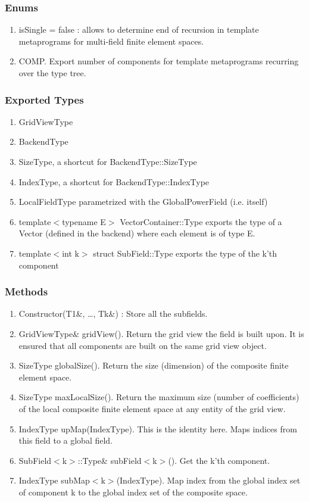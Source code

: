 \documentclass[11pt,a4paper,DIV11,%
notitlepage,oneside,abstracton,%
bibtotoc]{scrartcl}
\begin{document}
\subsubsection{Enums}

\begin{enumerate}[1)]
\item isSingle = false : allows to determine end of recursion in
  template metaprograms for multi-field finite element spaces.
\item COMP. Export number of components for template
  metaprograms recurring over the type tree.
\end{enumerate}

\subsubsection{Exported Types}

\begin{enumerate}[1)]
\item GridViewType 
\item BackendType
\item SizeType, a shortcut for BackendType::SizeType
\item IndexType, a shortcut for BackendType::IndexType
\item LocalFieldType parametrized with the GlobalPowerField (i.e. itself)
\item template$<$typename E$>$ VectorContainer::Type exports the type of a Vector
  (defined in the backend) where each element is of type E.
\item template$<$int k$>$ struct SubField::Type exports the type of
  the k'th component
\end{enumerate}

\subsubsection{Methods}

\begin{enumerate}[1)]
\item Constructor(T1\&, \ldots , Tk\&) : Store all the subfields.
\item GridViewType\& gridView(). Return the grid view 
  the field is built upon. It is ensured that all components are built
  on the same grid view object.
\item SizeType globalSize(). Return the size (dimension) of the
  composite finite element space.  
\item SizeType maxLocalSize(). Return the maximum size (number of
  coefficients) of the local composite finite element space at any entity of the
  grid view.
\item IndexType upMap(IndexType). This is the identity here. Maps
  indices from this field to a global field.
\item SubField$<$k$>$::Type\& subField$<$k$>$(). Get the k'th component.
\item IndexType subMap$<$k$>$(IndexType). Map index from the global
  index set of component k to the global index set of the composite space.
\end{enumerate}
\end{document}

